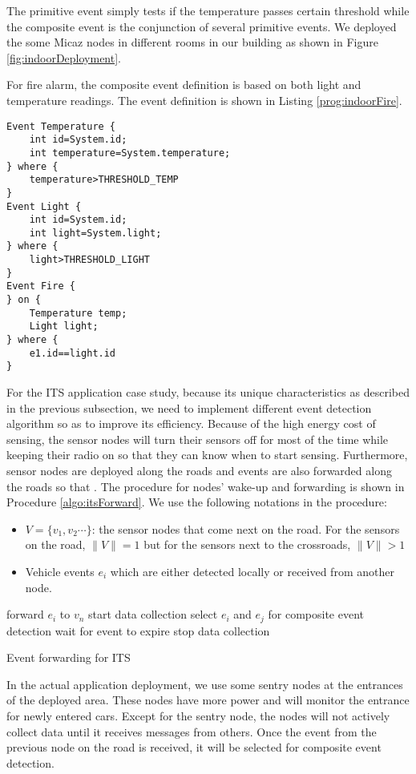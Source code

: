 The primitive event simply tests if the temperature passes certain threshold while the composite event is the conjunction of several primitive events. We deployed the some Micaz nodes in different rooms in our building as shown in Figure \ref{fig:indoorDeployment}.

For fire alarm, the composite event definition is based on both light and temperature readings. The event definition is shown in Listing \ref{prog:indoorFire}.
\begin{lstlisting}[caption=Event definition for fire alarm, label=prog:indoorFire]
Event Temperature {
	int id=System.id;
	int temperature=System.temperature;
} where {
	temperature>THRESHOLD_TEMP
}
Event Light {
	int id=System.id;
	int light=System.light;
} where {
	light>THRESHOLD_LIGHT
}
Event Fire {
} on {
	Temperature temp;
	Light light;
} where {
	e1.id==light.id
}
\end{lstlisting}

For the ITS application case study, because its unique characteristics as described in the previous subsection, we need to implement different event detection algorithm so as to improve its efficiency. Because of the high energy cost of sensing, the sensor nodes will turn their sensors off for most of the time while keeping their radio on so that they can know when to start sensing. Furthermore, sensor nodes are deployed along the roads and events are also forwarded along the roads so that . The procedure for nodes' wake-up and forwarding is shown in Procedure \ref{algo:itsForward}. We use the following notations in the procedure:
\begin{itemize}
\item \(V=\{v_1, v_2 \cdots \}\): the sensor nodes that come next on the road. For the sensors on the road, \(\|V\|=1\) but for the sensors next to the crossroads, \(\|V\|>1\)
\item Vehicle events \(e_i\) which are either detected locally or received from another node.
\end{itemize}

\begin{algorithm}
\begin{algorithmic}
			\STATE forward \(e_i\) to \(v_n\)
		\ENDFOR
	\ENDIF
		\STATE start data collection
			\STATE select \(e_i\) and \(e_j\) for composite event detection
		\ELSE
			\STATE wait for event to expire
		\ENDIF
		\STATE stop data collection
	\ENDIF
\end{algorithmic}
\caption{Event forwarding for ITS}
\label{algo:itsForward}
\end{algorithm}

In the actual application deployment, we use some sentry nodes at the entrances of the deployed area. These nodes have more power and will monitor the entrance for newly entered cars. Except for the sentry node, the nodes will not actively collect data until it receives messages from others. Once the event from the previous node on the road is received, it will be selected for composite event detection.